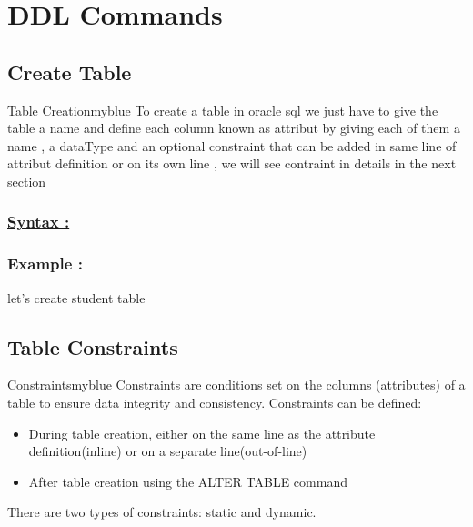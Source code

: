 \section{DDL Commands}
\subsection{Create Table}
\begin{prettyBox}{Table Creation}{myblue}
To create a table in oracle sql we just have to give the table a name and define each column known as attribut
by giving each of them a name , a dataType and an optional constraint that can be added in same line of
attribut definition or on its own line , we will see contraint in details in the next section
\end{prettyBox}

\vspace{0.5cm}
\subsubsection*{\underline{Syntax :}}




\vspace{0.5cm}
\subsubsection*{Example :} let's create student table 



\subsection{Table Constraints}

\begin{prettyBox}{Constraints}{myblue}
Constraints are conditions set on the columns (attributes) of a table to ensure data integrity and consistency. Constraints can be defined:
\begin{itemize}
    \item During table creation, either on the same line as the attribute definition(inline) or on a separate line(out-of-line)
    \item After table creation using the ALTER TABLE command
\end{itemize}

There are two types of constraints: static and dynamic.
\end{prettyBox}

